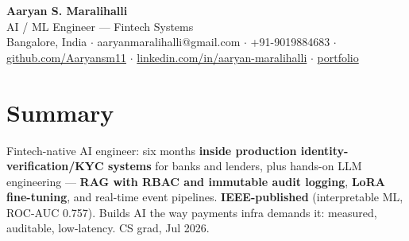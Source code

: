 \documentclass[10pt,a4paper]{article}
\begin{document}
\vspace*{-1cm}
\begin{center}
{\LARGE\bfseries Aaryan S. Maralihalli}\\[0.5em]
{\large AI / ML Engineer --- Fintech Systems}\\[0.3em]
Bangalore, India $\cdot$ aaryanmaralihalli@gmail.com $\cdot$ +91-9019884683 $\cdot$ \href{https://github.com/Aaryansm11}{github.com/Aaryansm11} $\cdot$ \href{https://linkedin.com/in/aaryan-maralihalli}{linkedin.com/in/aaryan-maralihalli} $\cdot$ \href{https://portfolio-zeta-ten-85.vercel.app}{portfolio}
\end{center}\vspace{0.4ex}
\section*{Summary}
Fintech-native AI engineer: six months \textbf{inside production identity-verification/KYC systems} for banks and lenders, plus hands-on LLM engineering --- \textbf{RAG with RBAC and immutable audit logging}, \textbf{LoRA fine-tuning}, and real-time event pipelines. \textbf{IEEE-published} (interpretable ML, ROC-AUC 0.757). Builds AI the way payments infra demands it: measured, auditable, low-latency. CS grad, Jul 2026.\par\vspace{2pt}
\end{document}
